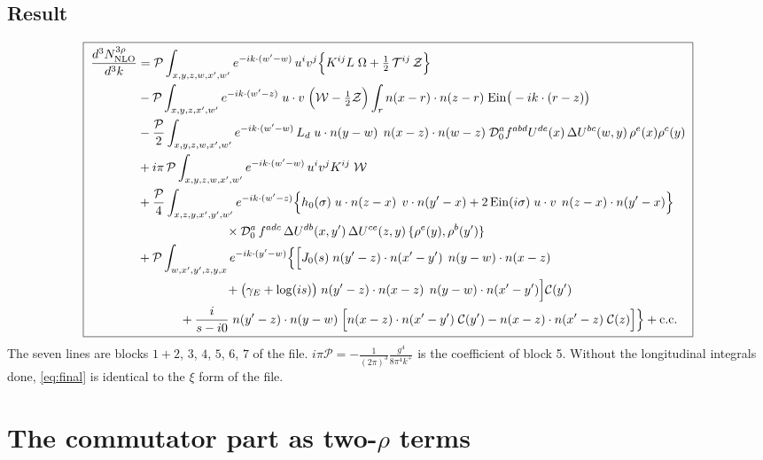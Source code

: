 \documentclass[10pt]{article}
\numberwithin{equation}{section}
\begin{document}
\subsection{Result}
\begin{align}
\boxed{\;\begin{aligned}
\frac{d^{3}N^{3\rho}_{\rm NLO}}{d^{3}k}&=\mathcal{P}\int_{x,y,z,w,x',w'}e^{-ik\cdot(w'-w)}\,u^{i}v^{j}\Big\{K^{ij}L\;\Omega+\tfrac12\,\mathcal{T}^{ij}\,\mathcal{Z}\Big\}\\
&-\mathcal{P}\int_{x,y,z,x',w'}e^{-ik\cdot(w'-z)}\;u\cdot v\;\Big(\mathcal{W}-\tfrac12\mathcal{Z}\Big)\int_{r}n(x-r)\cdot n(z-r)\;{\rm Ein}\big(-ik\cdot(r-z)\big)\\
&-\frac{\mathcal{P}}{2}\int_{x,y,z,w,x',w'}e^{-ik\cdot(w'-w)}\,L_{d}\;u\cdot n(y-w)\;\,n(x-z)\cdot n(w-z)\;\mathcal{D}_{0}^{a}f^{abd}U^{de}(x)\,\Delta U^{bc}(w,y)\,\rho^{e}(x)\rho^{c}(y)\\
&+i\pi\,\mathcal{P}\int_{x,y,z,w,x',w'}e^{-ik\cdot(w'-w)}\,u^{i}v^{j}K^{ij}\;\mathcal{W}\\
&+\frac{\mathcal{P}}{4}\int_{x,z,y,x',y',w'}e^{-ik\cdot(w'-z)}\Big\{h_{0}(\sigma)\;u\cdot n(z-x)\;\,v\cdot n(y'-x)+2\,{\rm Ein}(i\sigma)\;u\cdot v\;\,n(z-x)\cdot n(y'-x)\Big\}\\
&\hspace{2.5cm}\times\mathcal{D}_{0}^{a}\,f^{adc}\,\Delta U^{db}(x,y')\,\Delta U^{ce}(z,y)\,\{\rho^{e}(y),\rho^{b}(y')\}\\
&+\mathcal{P}\int_{w,x',y',z,y,x}e^{-ik\cdot(y'-w)}\Big\{\Big[J_{0}(s)\;n(y'-z)\cdot n(x'-y')\;\,n(y-w)\cdot n(x-z)\\
&\hspace{2.5cm}+\big(\gamma_{E}+\log(is)\big)\;n(y'-z)\cdot n(x-z)\;\,n(y-w)\cdot n(x'-y')\Big]\mathcal{C}(y')\\
&\hspace{1.2cm}+\frac{i}{s-i0}\;n(y'-z)\cdot n(y-w)\;\Big[n(x-z)\cdot n(x'-y')\;\mathcal{C}(y')-n(x-z)\cdot n(x'-z)\;\mathcal{C}(z)\Big]\Big\}+{\rm c.c.}
\end{aligned}\;} \label{eq:final}
\end{align}
The seven lines are blocks $1{+}2$, $3$, $4$, $5$, $6$, $7$ of the file. $i\pi\mathcal{P}=-\frac{1}{(2\pi)^{3}}\frac{g^{4}}{8\pi^{4}k^{+}}$ is the coefficient of block 5. Without the longitudinal integrals done, \eqref{eq:final} is identical to the $\xi$ form of the file.

\section{The commutator part as two-$\rho$ terms}
\end{document}
